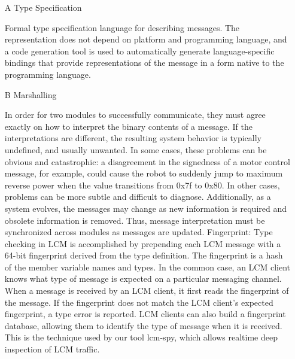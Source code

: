 	\begin{itemize}
	
	\item[A] Type Specification
	
	Formal type specification language for describing messages.
	The representation does not depend on platform and programming language, and a code generation tool is used to automatically generate language-specific bindings that provide representations of the message in a form native to the programming language. 

	
	\item[B] Marshalling
	
	In order for two modules to successfully communicate, they must agree exactly on how to interpret the binary contents of a message. If the interpretations are different, the resulting system behavior is typically undefined, and usually unwanted. In some cases, these problems can be obvious and catastrophic: a disagreement in the signedness of a motor control message, for example, could cause the robot to suddenly jump to maximum reverse power when the value transitions from 0x7f to 0x80. In other cases, problems can be more subtle and difficult to diagnose. Additionally, as a system evolves, the messages may change as new information is required and obsolete information is removed. Thus, message interpretation must be synchronized across modules as messages are updated.
	Fingerprint: Type checking in LCM is accomplished by prepending each LCM message with a 64-bit fingerprint derived from the type definition. The fingerprint is a hash of the member variable names and types. 
	In the common case, an LCM client knows what type of message is expected on a particular messaging channel.
	When a message is received by an LCM client, it first reads the fingerprint of the message. If the fingerprint does not match the LCM client’s expected fingerprint, a type error is reported.
	LCM clients can also build a fingerprint database, allowing them to identify the type of message when it is received. This is the technique used by our tool lcm-spy, which allows realtime deep inspection of LCM traffic.
	

\end{itemize}
